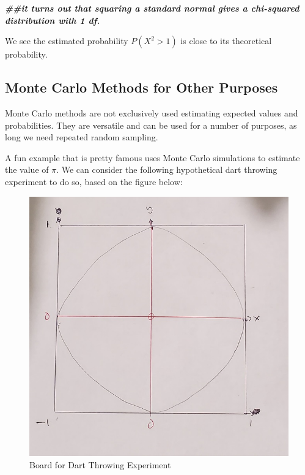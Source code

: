 \documentclass[
]{book}
\newenvironment{Shaded}{\begin{snugshade}}{\end{snugshade}}
\newcommand{\DocumentationTok}[1]{\textcolor[rgb]{0.56,0.35,0.01}{\textbf{\textit{#1}}}}
\begin{document}
\begin{Shaded}
\begin{Highlighting}[]
\DocumentationTok{\#\#it turns out that squaring a standard normal gives a chi{-}squared distribution with 1 df.}
\end{Highlighting}
\end{Shaded}

We see the estimated probability \(P(X^2 > 1)\) is close to its theoretical probability.

\hypertarget{monte-carlo-methods-for-other-purposes}{%
\subsection{Monte Carlo Methods for Other Purposes}\label{monte-carlo-methods-for-other-purposes}}

Monte Carlo methods are not exclusively used estimating expected values and probabilities. They are versatile and can be used for a number of purposes, as long we need repeated random sampling.

A fun example that is pretty famous uses Monte Carlo simulations to estimate the value of \(\pi\). We can consider the following hypothetical dart throwing experiment to do so, based on the figure below:

\begin{figure}
\centering
\includegraphics{images/06-circle.jpg}
\caption{\label{fig:circle}Board for Dart Throwing Experiment}
\end{figure}
\end{document}
